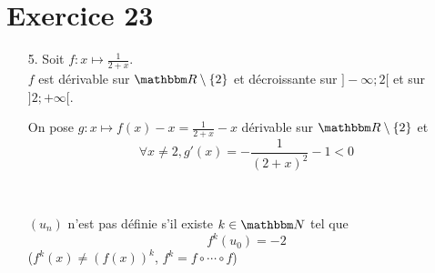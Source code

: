 \part{Exercice 23}

\begin{enumerate}
	\item[5. ] Soit $f: x \mapsto \frac{1}{2+x}$.\\
		$f$ est dérivable sur $\R\setminus \{2\}$ et décroissante sur $]-\infty;2[$ et sur $]2;+\infty[$.\\
		\begin{center}
		\end{center}
		On pose $g: x \mapsto f(x)- x = \frac{1}{2 +x} - x$ dérivable sur $\R\setminus \{2\}$ et \[
		\forall x \neq 2, g'(x) = -\frac{1}{(2+x)^2} -1 < 0
		\] 
		\begin{center}
			\\
		\end{center}

		$(u_n)$ n'est pas définie s'il existe $k \in \N$ tel que \[
		f^k(u_0) = -2
		\] ($f^k(x) \neq (f(x))^k$, $f^k = f \circ \cdots \circ f$)


\end{enumerate}
